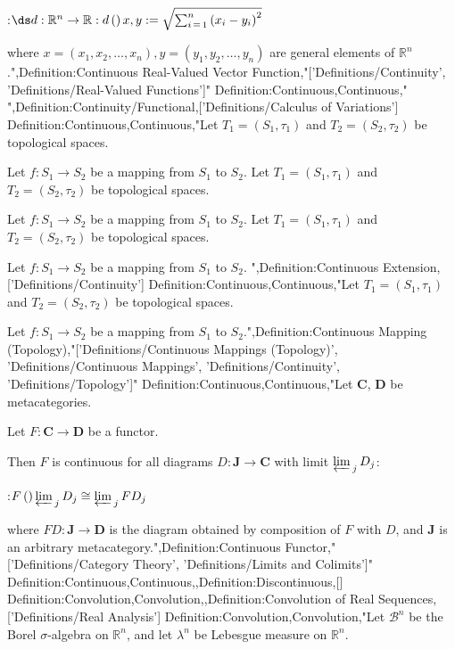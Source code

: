 :$\ds d: \mathbb R^n \to \mathbb R: d \left(   \right){x, y} := \sqrt {\sum_{i \mathop = 1}^n \left( x_i - y_i \right)^2}$

where $x = \left( x_1, x_2, \ldots, x_n \right), y = \left( y_1, y_2, \ldots, y_n \right)$ are general elements of $\mathbb R^n$.",Definition:Continuous Real-Valued Vector Function,"['Definitions/Continuity', 'Definitions/Real-Valued Functions']"
Definition:Continuous,Continuous,"
",Definition:Continuity/Functional,['Definitions/Calculus of Variations']
Definition:Continuous,Continuous,"Let $T_1 = \left( S_1, \tau_1 \right)$ and $T_2 = \left( S_2, \tau_2 \right)$ be topological spaces.

Let $f: S_1 \to S_2$ be a mapping from $S_1$ to $S_2$.
Let $T_1 = \left( S_1, \tau_1 \right)$ and $T_2 = \left( S_2, \tau_2 \right)$ be topological spaces.

Let $f: S_1 \to S_2$ be a mapping from $S_1$ to $S_2$.
Let $T_1 = \left( S_1, \tau_1 \right)$ and $T_2 = \left( S_2, \tau_2 \right)$ be topological spaces.

Let $f: S_1 \to S_2$ be a mapping from $S_1$ to $S_2$.
",Definition:Continuous Extension,['Definitions/Continuity']
Definition:Continuous,Continuous,"Let $T_1 = \left( S_1, \tau_1 \right)$ and $T_2 = \left( S_2, \tau_2 \right)$ be topological spaces.

Let $f: S_1 \to S_2$ be a mapping from $S_1$ to $S_2$.",Definition:Continuous Mapping (Topology),"['Definitions/Continuous Mappings (Topology)', 'Definitions/Continuous Mappings', 'Definitions/Continuity', 'Definitions/Topology']"
Definition:Continuous,Continuous,"Let $\mathbf C$, $\mathbf D$ be metacategories.

Let $F: \mathbf C \to \mathbf D$ be a functor.


Then $F$ is continuous  for all diagrams $D: \mathbf J \to \mathbf C$ with limit ${\varprojlim \,}_j \, D_j$:

:$F \left(   \right){{\varprojlim \,}_j \, D_j} \cong {\varprojlim \,}_j \, F D_j$

where $F D: \mathbf J \to \mathbf D$ is the diagram obtained by composition of $F$ with $D$, and $\mathbf J$ is an arbitrary metacategory.",Definition:Continuous Functor,"['Definitions/Category Theory', 'Definitions/Limits and Colimits']"
Definition:Continuous,Continuous,,Definition:Discontinuous,[]
Definition:Convolution,Convolution,,Definition:Convolution of Real Sequences,['Definitions/Real Analysis']
Definition:Convolution,Convolution,"Let $\mathcal B^n$ be the Borel $\sigma$-algebra on $\mathbb R^n$, and let $\lambda^n$ be Lebesgue measure on $\mathbb R^n$.

